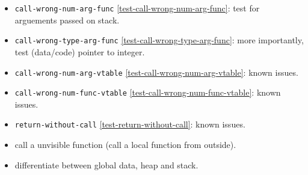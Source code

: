 \documentclass[a4paper]{book}
\begin{document}
\begin{itemize}
  \item \texttt{call-wrong-num-arg-func} \ref{test-call-wrong-num-arg-func}: test for arguements passed on stack.
  \item \texttt{call-wrong-type-arg-func} \ref{test-call-wrong-type-arg-func}: more importantly, test (data/code) pointer to integer.
  \item \texttt{call-wrong-num-arg-vtable} \ref{test-call-wrong-num-arg-vtable}: known issues.
  \item \texttt{call-wrong-num-func-vtable} \ref{test-call-wrong-num-func-vtable}: known issues.
  \item \texttt{return-without-call} \ref{test-return-without-call}: known issues.
  \item call a unvisible function (call a local function from outside).
  \item differentiate between global data, heap and stack.
\end{itemize}
\end{document}
